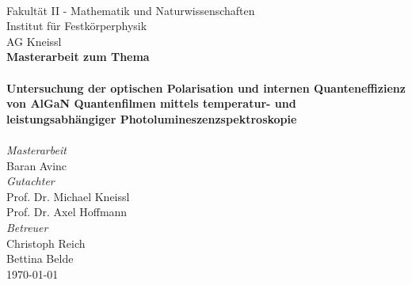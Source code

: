 
\begin{titlepage}
		\pagestyle{fancy}
		 \\
		\vspace{1cm} 
		\centering Fakultät II - Mathematik und Naturwissenschaften \\
		\centering Institut für Festkörperphysik \\
		\centering AG Kneissl \\
		\vspace{0.5cm}
		\centering\textbf{\large Masterarbeit zum Thema}\\
		\vspace{1cm} 
		\noindent{\color{RoyalPurple}\rule{\textwidth}{1pt}} \\
		\vspace{0.5cm} 
		\centering\textbf{\large Untersuchung der optischen Polarisation und internen Quanteneffizienz von AlGaN Quantenfilmen mittels temperatur- und leistungsabhängiger Photolumineszenzspektroskopie} \\
		\vspace{0.25cm} 
		\noindent{\color{RoyalPurple}\rule{\textwidth}{1pt}} \\
		\vspace{1cm}
		\centering \emph{ \large{Masterarbeit}} \\
		\centering Baran Avinc \\
		\vspace{1cm}
		\centering \emph{ \large{Gutachter}} \\
		\centering Prof. Dr. Michael Kneissl \\
		\centering Prof. Dr. Axel Hoffmann  \\
		\vspace{0.5cm} 
		\centering \emph{ \large{Betreuer}} \\
		\centering Christoph Reich \\
		\centering Bettina Belde \\
		\vspace{1cm}
		\centering  \today \\
\end{titlepage}


